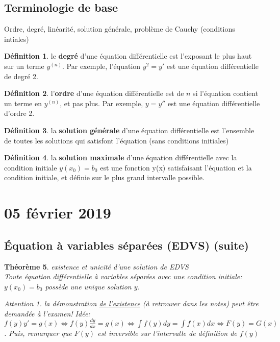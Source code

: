 \documentclass{report}
\theoremstyle{plain}
\newtheorem{thm}{Théorème}[section]
\theoremstyle{definition}
\newtheorem{defn}[thm]{Définition}
\theoremstyle{remark}
\newtheorem*{attention}{Attention}
\begin{document}
\subsection{Terminologie de base} %
Ordre, degré, linéarité, solution générale, problème de Cauchy (conditions intiales) \\
\begin{defn} le \textbf{degré} d'une équation différentielle est l'exposant le plus haut sur un terme $y^{(n)}$. Par exemple, l'équation $y^2 = y'$ est une équation différentielle de degré 2. 
\end{defn}
\begin{defn} l'\textbf{ordre} d'une équation différentielle est de $n$ si l'équation contient un terme en $y^{(n)}$, et pas plus. Par exemple, $y = y''$ est une équation différentielle d'ordre 2.
\end{defn}
\begin{defn} la \textbf{solution générale} d'une équation différentielle est l'ensemble de toutes les solutions qui satisfont l'équation (sans conditions initiales)
\end{defn}
\begin{defn} la \textbf{solution maximale} d'une équation différentielle avec la condition initiale $y(x_0) = b_0$ est une fonction y(x) satisfaisant l'équation et la condition initiale, et définie sur le plus grand intervalle possible.
\end{defn}

\section{05 février 2019}

\subsection{Équation à variables séparées (EDVS) (suite)}
\begin{thm} existence et unicité d'une solution de EDVS \\
Toute équation différentielle à variables séparées avec une condition initiale: $y(x_0) = b_0$ possède une unique solution $y$. \\
\begin{attention} la démonstration \underline{de l'existence} (à retrouver dans les notes) peut être demandée à l'examen! Idée: $f(y)y' = g(x) \iff f(y)\frac{dy}{dx} = g(x) \iff \int f(y)dy = \int f(x)dx \iff F(y) = G(x)$. Puis, remarquer que $F(y)$ est inversible sur l'intervalle de définition de $f(y)$
\end{attention}
\end{thm}
\end{document}
